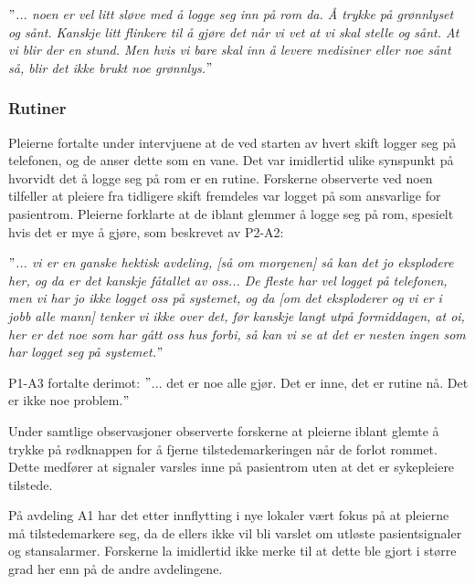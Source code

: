 \noindent
\textit{$"$... noen er vel litt sløve med å logge seg inn på rom da. Å trykke på grønnlyset og sånt. Kanskje litt flinkere til å gjøre det når vi vet at vi skal stelle og sånt. At vi blir der en stund. Men hvis vi bare skal inn å levere medisiner eller noe sånt så, blir det ikke brukt noe grønnlys.$"$}

\subsubsection{Rutiner}
Pleierne fortalte under intervjuene at de ved starten av hvert skift logger seg på telefonen, og de anser dette som en vane. Det var imidlertid ulike synspunkt på hvorvidt det å logge seg på rom er en rutine. Forskerne observerte ved noen tilfeller at pleiere fra tidligere skift fremdeles var logget på som ansvarlige for pasientrom. Pleierne forklarte at de iblant glemmer å logge seg på rom, spesielt hvis det er mye å gjøre, som beskrevet av P2-A2:

\noindent
\textit{$"$... vi er en ganske hektisk avdeling, [så om morgenen] så kan det jo eksplodere her, og da er det kanskje fåtallet av oss... De fleste har vel logget på telefonen, men vi har jo ikke logget oss på systemet, og da [om det eksploderer og vi er i jobb alle mann] tenker vi ikke over det, før kanskje langt utpå formiddagen, at oi, her er det noe som har gått oss hus forbi, så kan vi se at det er nesten ingen som har logget seg på systemet.$"$}

\noindent
P1-A3 fortalte derimot: $"$... det er noe alle gjør. Det er inne, det er rutine nå. Det er ikke noe problem.$"$ 

\noindent
Under samtlige observasjoner observerte forskerne at pleierne iblant glemte å trykke på rødknappen for å fjerne tilstedemarkeringen når de forlot rommet. Dette medfører at signaler varsles inne på pasientrom uten at det er sykepleiere tilstede.

\noindent
På avdeling A1 har det etter innflytting i nye lokaler vært fokus på at pleierne må tilstedemarkere seg, da de ellers ikke vil bli varslet om utløste pasientsignaler og stansalarmer. Forskerne la imidlertid ikke merke til at dette ble gjort i større grad her enn på de andre avdelingene.  

